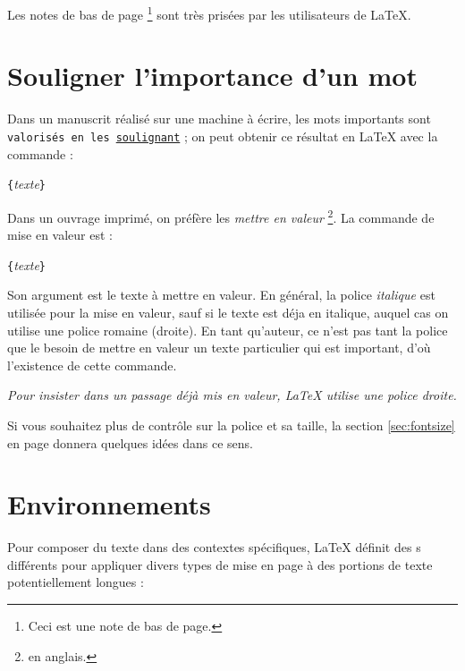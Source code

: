 \begin{example}
Les notes de bas de page
\footnote{Ceci est une note
	  de bas de page.}
sont très prisées par les
utilisateurs de \LaTeX{}.
\end{example}

\section{Souligner l'importance d'un mot}

Dans un manuscrit réalisé sur une machine à écrire, les mots
importants sont \texttt{valorisés en les \underline{soulignant}} ;
on peut obtenir ce résultat en \LaTeX{} avec la commande :
\begin{lscommand}
\verb|{|\textit{texte}\verb|}|
\end{lscommand}

Dans un ouvrage
imprimé, on préfère les \emph{mettre en valeur}%
\footnote{ en anglais.}.
La commande de mise en valeur est :
\begin{lscommand}
\verb|{|\emph{texte}\verb|}|
\end{lscommand}

Son argument est le texte à mettre en valeur. En général, la police
\emph{italique} est utilisée pour la mise en valeur, sauf si le texte
est déja en italique, auquel cas on utilise une police romaine (droite).
En tant qu'auteur, ce n'est pas tant la police que le besoin de mettre
en valeur un texte particulier qui est important, d'où l'existence de
cette commande.

\begin{example}
\emph{Pour \emph{insister}
dans un passage déjà
mis en valeur, \LaTeX{}
utilise une police droite.}
\end{example}

Si vous souhaitez plus de contrôle sur la police et sa taille, la
section \ref{sec:fontsize} en page \pageref{sec:fontsize} donnera
quelques idées dans ce sens.

\section{Environnements} \label{env}

Pour composer du texte dans des contextes spécifiques, \LaTeX{}
définit des s différents pour appliquer divers types
de mise en page à des portions de texte potentiellement longues :

